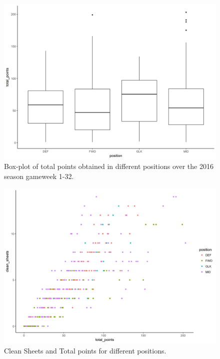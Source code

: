 \begin{figure}[H]
    \centering
    \includegraphics[scale=0.55]{fig/chapter_6/box_plot_positions.png}
    \caption{Box-plot of total points obtained in different positions over the 2016 season gameweek 1-32.}
\label{fig:box_plot}    
\end{figure}

\begin{figure}[H]
    \centering
    \includegraphics[scale=0.55]{fig/chapter_6/clean_sheet_tot_poins.png}
    \caption{Clean Sheets and Total points for different positions.}
\label{fig:cs_tot_p}    
\end{figure}

